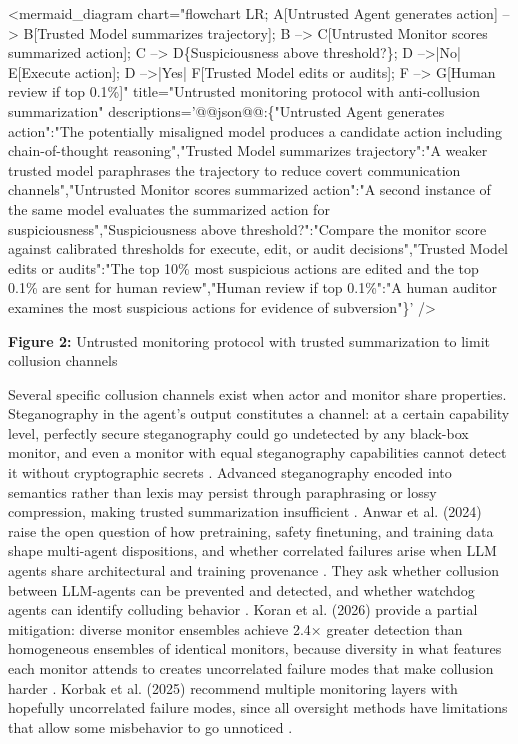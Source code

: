 <mermaid\_diagram chart="flowchart LR; A[Untrusted Agent generates action] --> B[Trusted Model summarizes trajectory]; B --> C[Untrusted Monitor scores summarized action]; C --> D\{Suspiciousness above threshold?\}; D -->|No| E[Execute action]; D -->|Yes| F[Trusted Model edits or audits]; F --> G[Human review if top 0.1\%]" title="Untrusted monitoring protocol with anti-collusion summarization" descriptions='@@json@@:\{"Untrusted Agent generates action":"The potentially misaligned model produces a candidate action including chain-of-thought reasoning","Trusted Model summarizes trajectory":"A weaker trusted model paraphrases the trajectory to reduce covert communication channels","Untrusted Monitor scores summarized action":"A second instance of the same model evaluates the summarized action for suspiciousness","Suspiciousness above threshold?":"Compare the monitor score against calibrated thresholds for execute, edit, or audit decisions","Trusted Model edits or audits":"The top 10\% most suspicious actions are edited and the top 0.1\% are sent for human review","Human review if top 0.1\%":"A human auditor examines the most suspicious actions for evidence of subversion"\}' />


\textbf{Figure 2:} Untrusted monitoring protocol with trusted summarization to limit collusion channels


Several specific collusion channels exist when actor and monitor share properties. Steganography in the agent's output constitutes a channel: at a certain capability level, perfectly secure steganography could go undetected by any black-box monitor, and even a monitor with equal steganography capabilities cannot detect it without cryptographic secrets  \cite{Anwar2024Foundational}. Advanced steganography encoded into semantics rather than lexis may persist through paraphrasing or lossy compression, making trusted summarization insufficient  \cite{Anwar2024Foundational}. Anwar et al. (2024) raise the open question of how pretraining, safety finetuning, and training data shape multi-agent dispositions, and whether correlated failures arise when LLM agents share architectural and training provenance  \cite{Anwar2024Foundational}. They ask whether collusion between LLM-agents can be prevented and detected, and whether watchdog agents can identify colluding behavior  \cite{Anwar2024Foundational}. Koran et al. (2026) provide a partial mitigation: diverse monitor ensembles achieve 2.4× greater detection than homogeneous ensembles of identical monitors, because diversity in what features each monitor attends to creates uncorrelated failure modes that make collusion harder  \cite{Koran2026Ensemble}. Korbak et al. (2025) recommend multiple monitoring layers with hopefully uncorrelated failure modes, since all oversight methods have limitations that allow some misbehavior to go unnoticed  \cite{Korbak2025Chain}.


